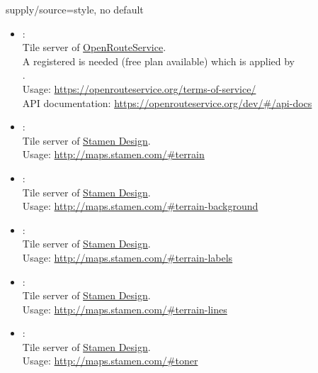 \begin{docMrcKey}{supply/source}{=}{style, no default}
\begin{itemize}
\clearpage
  \item{}:\\
    Tile server of \href{https://openrouteservice.org/}{OpenRouteService}.\\
    A registered  is needed (free plan available)
    which is applied by\\
    .\\
    Usage: \url{https://openrouteservice.org/terms-of-service/}\\
    API documentation: \url{https://openrouteservice.org/dev/#/api-docs}

  \item{}:\\
    Tile server of \href{http://stamen.com}{Stamen Design}.\\
    Usage: \url{http://maps.stamen.com/#terrain}

  \item{}:\\
    Tile server of \href{http://stamen.com}{Stamen Design}.\\
    Usage: \url{http://maps.stamen.com/#terrain-background}

\clearpage
  \item{}:\\
    Tile server of \href{http://stamen.com}{Stamen Design}.\\
    Usage: \url{http://maps.stamen.com/#terrain-labels}

  \item{}:\\
    Tile server of \href{http://stamen.com}{Stamen Design}.\\
    Usage: \url{http://maps.stamen.com/#terrain-lines}

  \item{}:\\
    Tile server of \href{http://stamen.com}{Stamen Design}.\\
    Usage: \url{http://maps.stamen.com/#toner}


\end{itemize}
\end{docMrcKey}
